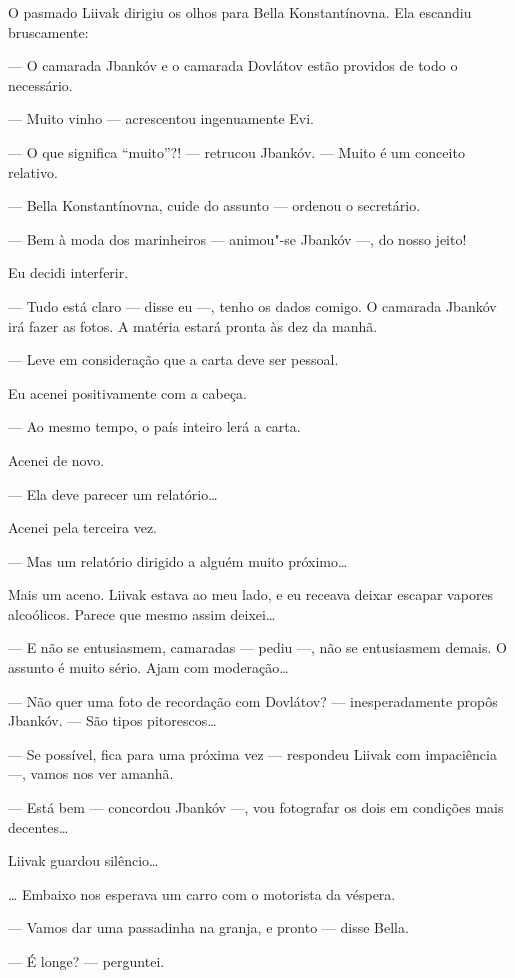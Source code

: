 O pasmado Liivak dirigiu os olhos para Bella Konstantínovna. Ela
escandiu bruscamente:

--- O camarada Jbankóv e o camarada Dovlátov estão providos de
todo o necessário.

--- Muito vinho --- acrescentou ingenuamente Evi.

--- O que significa ``muito''?! --- retrucou Jbankóv.
--- Muito é um conceito relativo.

--- Bella Konstantínovna, cuide do assunto --- ordenou o
secretário.

--- Bem à moda dos marinheiros --- animou"-se Jbankóv ---, do nosso jeito!

Eu decidi interferir.

--- Tudo está claro --- disse eu ---, tenho os
dados comigo. O camarada Jbankóv irá fazer as fotos. A matéria estará
pronta às dez da manhã.

--- Leve em consideração que a carta deve ser pessoal.

Eu acenei positivamente com a cabeça.

--- Ao mesmo tempo, o país inteiro lerá a carta.

Acenei de novo.

--- Ela deve parecer um relatório\ldots{}

Acenei pela terceira vez.

--- Mas um relatório dirigido a alguém muito próximo\ldots{}

Mais um aceno. Liivak estava ao meu lado, e eu receava deixar escapar
vapores alcoólicos. Parece que mesmo assim deixei\ldots{}

--- E não se entusiasmem, camaradas --- pediu ---,
não se entusiasmem demais. O assunto é muito sério. Ajam com
moderação\ldots{}

--- Não quer uma foto de recordação com Dovlátov? ---
inesperadamente propôs Jbankóv. --- São tipos pitorescos\ldots{}

--- Se possível, fica para uma próxima vez --- respondeu
Liivak com impaciência ---, vamos nos ver amanhã.

--- Está bem --- concordou Jbankóv ---, vou
fotografar os dois em condições mais decentes\ldots{}

Liivak guardou silêncio\ldots{}

\ldots{} Embaixo nos esperava um carro com o motorista da véspera.

--- Vamos dar uma passadinha na granja, e pronto --- disse
Bella.

--- É longe? --- perguntei.

